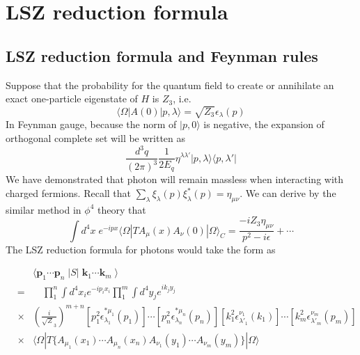 \section{LSZ reduction formula}
\subsection{LSZ reduction formula and Feynman rules}
\noindent
Suppose that the probability for the quantum field to create or annihilate an exact one-particle eigenstate of $H$ is $Z_3$, i.e.
\[\langle \Omega | A(0) | p,\lambda \rangle = \sqrt{Z_3} \epsilon_{\lambda}(p)\]
In Feynman gauge, because the norm of $|p,0\rangle$ is negative, the expansion of orthogonal complete set will be written as
\[\frac{d^3q}{(2\pi)^3} \frac{1}{2E_q} \eta^{\lambda\lambda'} | p,\lambda\rangle\langle p, \lambda' |\]
We have demonstrated that photon will remain massless when interacting with charged fermions. Recall that $\sum_{\lambda}\xi_{\lambda}(p)\xi^{*}_{\lambda}(p) = \eta_{\mu\nu}$. 
We can derive by the similar method in $\phi^4$ theory that
\[\int d^4x \; e^{-ipx} \langle \Omega | T A_{\mu}(x) A_{\nu}(0) | \Omega \rangle_C = \frac{-iZ_3\eta_{\mu\nu}}{p^2-i\epsilon} + \cdots \]
The LSZ reduction formula for photons would take the form as\\

\begin{newthem}
\begin{eqnarray}
&\phantom{=}& \langle \bm{p}_1 \cdots \bm{p}_n \; | S | \; \bm{k}_1 \cdots \bm{k}_m \; \rangle  
\nonumber \\
&=& \quad \prod_1^n \int d^4 x_i e^{-i p_ix_i } \prod_1^m \int d^4 y_j e^{ik_jy_j} 
\nonumber \\
&\times & \left( \frac{i}{\sqrt{Z}_3} \right) ^{m+n}  [p_1^2 \epsilon^{*\mu_1}_{\lambda_1}(p_1)] \cdots [p_n^2 \epsilon^{*\mu_n}_{\lambda_n}(p_n)] [k_1^2 \epsilon^{ \nu_1}_{\lambda'_1}(k_1)] \cdots [k_m^2 \epsilon^{ \nu_m}_{\lambda'_m}(p_m)]
\nonumber \\
&\times & \langle \Omega | T \{A_{\mu_1}(x_1) \cdots A_{\mu_n}(x_n)
A_{\nu_1}(y_1) \cdots A_{\nu_m}(y_m) \} | \Omega \rangle
\nonumber
\end{eqnarray}
\end{newthem}

